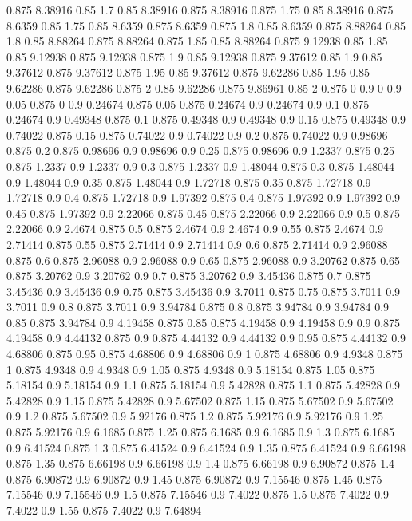 0.875 8.38916
0.85 1.7
0.85 8.38916
0.875 8.38916
0.875 1.75
0.85 8.38916
0.875 8.6359
0.85 1.75
0.85 8.6359
0.875 8.6359
0.875 1.8
0.85 8.6359
0.875 8.88264
0.85 1.8
0.85 8.88264
0.875 8.88264
0.875 1.85
0.85 8.88264
0.875 9.12938
0.85 1.85
0.85 9.12938
0.875 9.12938
0.875 1.9
0.85 9.12938
0.875 9.37612
0.85 1.9
0.85 9.37612
0.875 9.37612
0.875 1.95
0.85 9.37612
0.875 9.62286
0.85 1.95
0.85 9.62286
0.875 9.62286
0.875 2
0.85 9.62286
0.875 9.86961
0.85 2
0.875 0
0.9 0
0.9 0.05
0.875 0
0.9 0.24674
0.875 0.05
0.875 0.24674
0.9 0.24674
0.9 0.1
0.875 0.24674
0.9 0.49348
0.875 0.1
0.875 0.49348
0.9 0.49348
0.9 0.15
0.875 0.49348
0.9 0.74022
0.875 0.15
0.875 0.74022
0.9 0.74022
0.9 0.2
0.875 0.74022
0.9 0.98696
0.875 0.2
0.875 0.98696
0.9 0.98696
0.9 0.25
0.875 0.98696
0.9 1.2337
0.875 0.25
0.875 1.2337
0.9 1.2337
0.9 0.3
0.875 1.2337
0.9 1.48044
0.875 0.3
0.875 1.48044
0.9 1.48044
0.9 0.35
0.875 1.48044
0.9 1.72718
0.875 0.35
0.875 1.72718
0.9 1.72718
0.9 0.4
0.875 1.72718
0.9 1.97392
0.875 0.4
0.875 1.97392
0.9 1.97392
0.9 0.45
0.875 1.97392
0.9 2.22066
0.875 0.45
0.875 2.22066
0.9 2.22066
0.9 0.5
0.875 2.22066
0.9 2.4674
0.875 0.5
0.875 2.4674
0.9 2.4674
0.9 0.55
0.875 2.4674
0.9 2.71414
0.875 0.55
0.875 2.71414
0.9 2.71414
0.9 0.6
0.875 2.71414
0.9 2.96088
0.875 0.6
0.875 2.96088
0.9 2.96088
0.9 0.65
0.875 2.96088
0.9 3.20762
0.875 0.65
0.875 3.20762
0.9 3.20762
0.9 0.7
0.875 3.20762
0.9 3.45436
0.875 0.7
0.875 3.45436
0.9 3.45436
0.9 0.75
0.875 3.45436
0.9 3.7011
0.875 0.75
0.875 3.7011
0.9 3.7011
0.9 0.8
0.875 3.7011
0.9 3.94784
0.875 0.8
0.875 3.94784
0.9 3.94784
0.9 0.85
0.875 3.94784
0.9 4.19458
0.875 0.85
0.875 4.19458
0.9 4.19458
0.9 0.9
0.875 4.19458
0.9 4.44132
0.875 0.9
0.875 4.44132
0.9 4.44132
0.9 0.95
0.875 4.44132
0.9 4.68806
0.875 0.95
0.875 4.68806
0.9 4.68806
0.9 1
0.875 4.68806
0.9 4.9348
0.875 1
0.875 4.9348
0.9 4.9348
0.9 1.05
0.875 4.9348
0.9 5.18154
0.875 1.05
0.875 5.18154
0.9 5.18154
0.9 1.1
0.875 5.18154
0.9 5.42828
0.875 1.1
0.875 5.42828
0.9 5.42828
0.9 1.15
0.875 5.42828
0.9 5.67502
0.875 1.15
0.875 5.67502
0.9 5.67502
0.9 1.2
0.875 5.67502
0.9 5.92176
0.875 1.2
0.875 5.92176
0.9 5.92176
0.9 1.25
0.875 5.92176
0.9 6.1685
0.875 1.25
0.875 6.1685
0.9 6.1685
0.9 1.3
0.875 6.1685
0.9 6.41524
0.875 1.3
0.875 6.41524
0.9 6.41524
0.9 1.35
0.875 6.41524
0.9 6.66198
0.875 1.35
0.875 6.66198
0.9 6.66198
0.9 1.4
0.875 6.66198
0.9 6.90872
0.875 1.4
0.875 6.90872
0.9 6.90872
0.9 1.45
0.875 6.90872
0.9 7.15546
0.875 1.45
0.875 7.15546
0.9 7.15546
0.9 1.5
0.875 7.15546
0.9 7.4022
0.875 1.5
0.875 7.4022
0.9 7.4022
0.9 1.55
0.875 7.4022
0.9 7.64894
